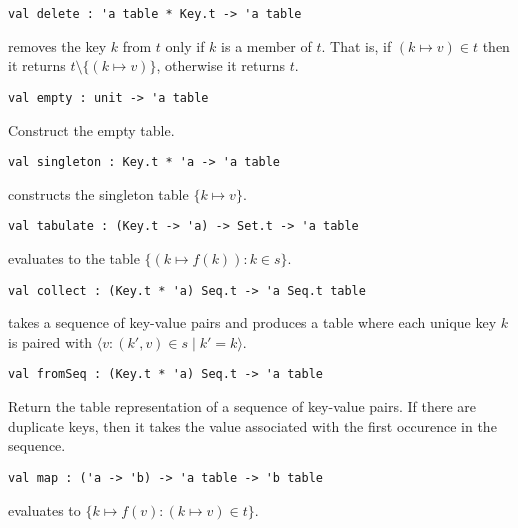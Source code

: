 \begin{gram}[delete]
\begin{verbatim}
val delete : 'a table * Key.t -> 'a table
\end{verbatim}
 removes the key $k$ from $t$ only if $k$ is a member of $t$.
That is, if $(k \mapsto v) \in t$ then it returns
$t \setminus \{(k \mapsto v)\}$, otherwise it returns $t$.
\end{gram}

\begin{gram}[empty]
\begin{verbatim}
val empty : unit -> 'a table
\end{verbatim}
Construct the empty table.
\end{gram}

\begin{gram}[singleton]
\label{gr:table-interface:singleton}
\begin{verbatim}
val singleton : Key.t * 'a -> 'a table
\end{verbatim}
 constructs the singleton table $\{k \mapsto v\}$.
\end{gram}

\begin{gram}[tabulate]
\begin{verbatim}
val tabulate : (Key.t -> 'a) -> Set.t -> 'a table
\end{verbatim}
 evaluates to the table $\{(k \mapsto f(k)) : k \in s\}$.
\end{gram}

\begin{gram}[collect]
\begin{verbatim}
val collect : (Key.t * 'a) Seq.t -> 'a Seq.t table
\end{verbatim}
 takes a sequence of key-value pairs and produces a table where
each unique key $k$ is paired with
$\langle v : (k',v) \in s \mathbin| k' = k \rangle$.
\end{gram}

\begin{gram}[fromSeq]
\begin{verbatim}
val fromSeq : (Key.t * 'a) Seq.t -> 'a table
\end{verbatim}
Return the table representation of a sequence of key-value pairs. If there are
duplicate keys, then it takes the value associated with the first occurence in
the sequence.
\end{gram}

\begin{gram}[map]
\begin{verbatim}
val map : ('a -> 'b) -> 'a table -> 'b table
\end{verbatim}
 evaluates to $\{k \mapsto f(v) : (k \mapsto v) \in t\}$.
\end{gram}

